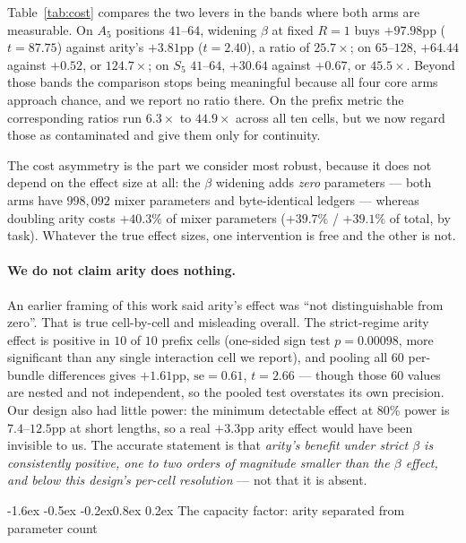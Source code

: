 \documentclass[10pt,twocolumn]{article}
\makeatletter
\renewcommand\subsection{\@startsection{subsection}{2}{\z@}%
  {-1.6ex \@plus -0.5ex \@minus -0.2ex}{0.8ex \@plus 0.2ex}%
  {\normalfont\normalsize\bfseries}}
\makeatother
\begin{document}
Table~\ref{tab:cost} compares the two levers in the bands where both arms are
measurable. On $A_5$ positions $41$--$64$, widening $\beta$ at fixed $R=1$ buys
$+97.98$pp ($t=87.75$) against arity's $+3.81$pp ($t=2.40$), a ratio of
$25.7\times$; on $65$--$128$, $+64.44$ against $+0.52$, or $124.7\times$; on
$S_5$ $41$--$64$, $+30.64$ against $+0.67$, or $45.5\times$. Beyond those bands
the comparison stops being meaningful because all four core arms approach chance, and
we report no ratio there. On the prefix metric the corresponding ratios run
$6.3\times$ to $44.9\times$ across all ten cells, but we now regard those as
contaminated and give them only for continuity.

The cost asymmetry is the part we consider most robust, because it does not
depend on the effect size at all: the $\beta$ widening adds \emph{zero}
parameters --- both arms have $998{,}092$ mixer parameters and byte-identical
ledgers --- whereas doubling arity costs $+40.3\%$ of mixer parameters
($+39.7\%$ / $+39.1\%$ of total, by task). Whatever the true effect sizes, one
intervention is free and the other is not.

\paragraph{We do not claim arity does nothing.}
An earlier framing of this work said arity's effect was ``not distinguishable
from zero''. That is true cell-by-cell and misleading overall. The strict-regime
arity effect is positive in $10$ of $10$ prefix cells (one-sided sign test
$p=0.00098$, more significant than any single interaction cell we report), and
pooling all 60 per-bundle differences gives $+1.61$pp, $\mathrm{se}=0.61$,
$t=2.66$ --- though those 60 values are nested and not independent, so the
pooled test overstates its own precision. Our design also had little power: the
minimum detectable effect at 80\% power is $7.4$--$12.5$pp at short lengths, so
a real $+3.3$pp arity effect would have been invisible to us. The accurate
statement is that \emph{arity's benefit under strict $\beta$ is consistently
positive, one to two orders of magnitude smaller than the $\beta$ effect, and
below this design's per-cell resolution} --- not that it is absent.

\subsection{The capacity factor: arity separated from parameter count}
\label{sec:capacity}
\end{document}
